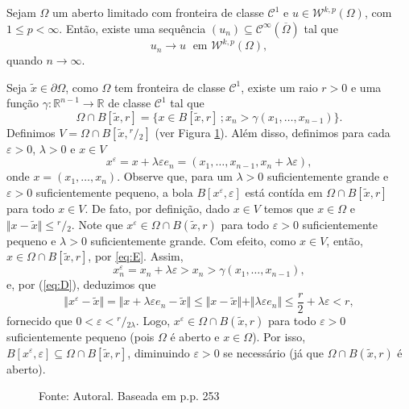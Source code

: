 \documentclass[a4paper, 11pt]{book}
\theoremstyle{definition}
\newcommand{\bR}{\mathbb{R}}
\newcommand{\cC}{\mathcal{C}}
\newcommand{\cW}{\mathcal{W}}
\newcommand{\sfrac}[2]{{}^{#1}\!\!/\!_{#2}}
\begin{document}
\begin{tbox} \label{thm:aprox3}
    Sejam $\Omega$ um aberto limitado com fronteira de classe $\cC^1$ e $u \in \cW^{k,p}(\Omega)$, com $1 \leqslant p < \infty$.
    Então, existe uma sequência $(u_n) \subseteq \cC^\infty(\overline\Omega)$ tal que
    \[
        u_n \to u \;\text{ em } \cW^{k,p}(\Omega),
    \]
    quando $n \to \infty$.
\end{tbox}
\begin{prf}
    Seja $\tilde x \in \partial \Omega$, como $\Omega$ tem fronteira de classe $\cC^1$, existe um raio $r > 0$ e uma função $\gamma : \bR^{n-1} \to \bR$ de classe $\cC^1$ tal que
    \begin{equation} \label{eq:E}
        \Omega \cap B[\tilde x, r] = \{x \in B[\tilde x, r] \,; x_n > \gamma(x_1,\dots,x_{n-1})\}.
    \end{equation}
    Definimos $V = \Omega \cap B[\tilde x, \sfrac{r}{2}]$ (ver Figura \ref{fig:conjunto-demonstracao-aprox-3}).
    Além disso, definimos para cada $\varepsilon > 0$, $\lambda > 0$ e $x \in V$
    \begin{equation} \label{eq:D}
        x^\varepsilon = x + \lambda \varepsilon e_n = (x_1,\dots,x_{n-1}, x_n + \lambda\varepsilon),
    \end{equation}
    onde $x = (x_1,\dots,x_n)$.
    Observe que, para um $\lambda > 0$ suficientemente grande e $\varepsilon > 0$ suficientemente pequeno, a bola $B[x^\varepsilon\!,\varepsilon]$ está contída em $\Omega \cap B[\tilde x,r]$ para todo $x \in V$.
    De fato, por definição, dado $x \in V$ temos que $x \in \Omega$ e $\Vert x - \tilde x \Vert \leqslant \sfrac{r}{2}$.
    Note que $x^\varepsilon \in \Omega \cap B(\tilde x, r)$ para todo $\varepsilon > 0$ suficientemente pequeno e $\lambda > 0$ suficientemente grande.
    Com efeito, como $x \in V$, então, $x \in \Omega \cap B[\tilde x, r]$, por \ref{eq:E}. Assim,
    \[
        x^\varepsilon_n = x_n + \lambda \varepsilon > x_n >  \gamma(x_{1},\dots,x_{n-1}),
    \]
    e, por (\ref{eq:D}), deduzimos que
    \[
        \Vert x^\varepsilon - \tilde x \Vert = \Vert x + \lambda \varepsilon e_n - \tilde x \Vert \leqslant \Vert x - \tilde x \Vert + \Vert \lambda \varepsilon e_n  \Vert \leqslant \frac{r}{2} + \lambda\varepsilon < r,
    \]
    fornecido que $0 <\varepsilon < \sfrac{r}{2\lambda}$.
    Logo, $x^\varepsilon \in \Omega \cap B(\tilde x, r)$ para todo $\varepsilon > 0$ suficientemente pequeno (pois $\Omega$ é aberto e $x \in \Omega$).
    Por isso,
    $B[x^\varepsilon\!, \varepsilon] \subseteq \Omega \cap B[\tilde x,r]$, diminuindo $\varepsilon > 0$ se necessário (já que $\Omega \cap B(\tilde x, r)$ é aberto).
    \begin{figure}
        \centering
        
        \caption{Fonte: Autoral. Baseada em \cite{evans-pde} p.p. 253}
        \label{fig:conjunto-demonstracao-aprox-3}
    \end{figure}


\end{prf}
\end{document}
